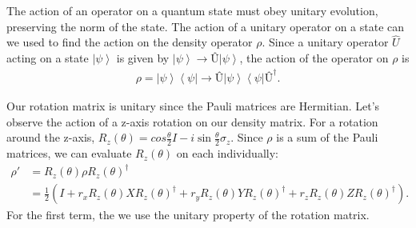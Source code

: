 \documentclass[11pt]{article} %
\newcommand{\bra}[1]{\left\langle #1 \right|}
\newcommand{\ket}[1]{\left|#1\right\rangle}
\begin{document}
The action of an operator on a quantum state must obey unitary evolution, preserving the norm of the state. The action of a unitary operator on a state can we used to find the action on the density operator $\rho$. Since a unitary operator $\hat{U}$ acting on a state $\ket{\psi}$ is given by $\ket{\psi} \rightarrow \textrm{\^U}\ket{\psi}$, the action of the operator on $\rho$ is
\begin{align}
    \rho = \ket{\psi}\bra{\psi} \rightarrow \textrm{\^U}\ket{\psi}\bra{\psi}\textrm{\^U}^\dagger.
\end{align}

Our rotation matrix is unitary since the Pauli matrices are Hermitian. Let's observe the action of a z-axis rotation on our density matrix. For a rotation around the z-axis, $R_z(\theta) = cos\frac{\theta}{2}I-i\sin\frac{\theta}{2}\sigma_z$. Since $\rho$ is a sum of the Pauli matrices, we can evaluate $R_z(\theta)$ on each individually:
\begin{align}
    \rho' &= R_z(\theta)\rho R_z(\theta)^\dagger\\
    &= \frac{1}{2}\left(I+r_x R_z(\theta)X R_z(\theta)^\dagger +r_y R_z(\theta)Y R_z(\theta)^\dagger + r_z R_z(\theta)Z R_z(\theta)^\dagger\right).
\end{align}
For the first term, the we use the unitary property of the rotation matrix.
\end{document}
